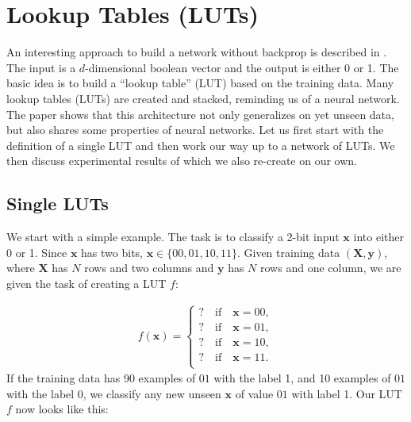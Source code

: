 \section{Lookup Tables (LUTs)} \label{sec:luts}
An interesting approach to build a network without backprop is described in \cite{bib:chatterjee2018learning}. The input is a $d$-dimensional boolean vector and the output is either 0 or 1. The basic idea is to build a \enquote{lookup table} (LUT) based on the training data. Many lookup tables (LUTs) are created and stacked, reminding us of a neural network. The paper shows that this architecture not only generalizes on yet unseen data, but also shares some properties of neural networks. Let us first start with the definition of a single LUT and then work our way up to a network of LUTs. We then discuss experimental results of \cite{bib:chatterjee2018learning} which we also re-create on our own.

\subsection{Single LUTs}
We start with a simple example. The task is to classify a 2-bit input $\bm{x}$ into either 0 or 1. Since $\bm{x}$ has two bits, $\bm{x} \in \{00, 01, 10, 11 \}$. Given training data $(\bm{X}, \bm{y})$, where $\bm{X}$ has $N$ rows and two columns and $\bm{y}$ has $N$ rows and one column, we are given the task of creating a LUT $f$:

\begin{align}
    f(\bm{x}) = \begin{cases}
        ? \quad \text{if} \quad \bm{x} = 00, \\
        ? \quad \text{if} \quad \bm{x} = 01, \\
        ? \quad \text{if} \quad \bm{x} = 10, \\
        ? \quad \text{if} \quad \bm{x} = 11. \\
    \end{cases}
\end{align} If the training data has 90 examples of $01$ with the label 1, and 10 examples of $01$ with the label 0, we classify any new unseen $\bm{x}$ of value $01$ with label 1. Our LUT $f$ now looks like this:

